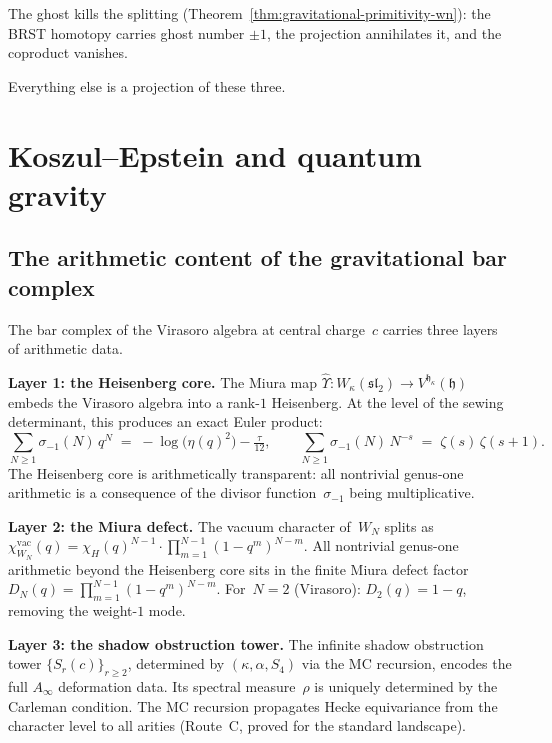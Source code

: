 \documentclass[11pt]{article}
\begin{document}
The ghost kills the splitting
(Theorem~\ref{thm:gravitational-primitivity-wn}): the BRST
homotopy carries ghost number $\pm 1$, the projection
annihilates it, and the coproduct vanishes.

Everything else is a projection of these three.


\section{Koszul--Epstein and quantum gravity}
\label{sec:koszul-epstein-gravity}

\subsection{The arithmetic content of the gravitational bar complex}

The bar complex of the Virasoro algebra at central charge~$c$
carries three layers of arithmetic data.

\textbf{Layer 1: the Heisenberg core.}
The Miura map $\hat\Upsilon\colon W_\kappa(\mathfrak{sl}_2) \to
V^{\mathfrak{h}_\kappa}(\mathfrak{h})$ embeds the Virasoro
algebra into a rank-$1$ Heisenberg.  At the level of the
sewing determinant, this produces an exact Euler product:
\[
\sum_{N \ge 1} \sigma_{-1}(N)\,q^N
\;=\; -\log\bigl(\eta(q)^2\bigr) - \tfrac{\tau}{12},
\qquad
\sum_{N \ge 1} \sigma_{-1}(N)\,N^{-s}
\;=\; \zeta(s)\,\zeta(s+1).
\]
The Heisenberg core is arithmetically transparent: all
nontrivial genus-one arithmetic is a consequence of the
divisor function~$\sigma_{-1}$ being multiplicative.

\textbf{Layer 2: the Miura defect.}
The vacuum character of~$W_N$ splits as
$\chi^{\mathrm{vac}}_{W_N}(q)
= \chi_H(q)^{N-1} \cdot
\prod_{m=1}^{N-1}(1-q^m)^{N-m}$.
All nontrivial genus-one arithmetic beyond the Heisenberg core
sits in the finite Miura defect factor
$D_N(q) = \prod_{m=1}^{N-1}(1-q^m)^{N-m}$.
For~$N = 2$ (Virasoro): $D_2(q) = 1 - q$, removing the weight-$1$
mode.

\textbf{Layer 3: the shadow obstruction tower.}
The infinite shadow obstruction tower $\{S_r(c)\}_{r \ge 2}$, determined by
$(\kappa, \alpha, S_4)$ via the MC recursion, encodes the full
$A_\infty$ deformation data.  Its spectral measure~$\rho$ is
uniquely determined by the Carleman condition.  The MC recursion
propagates Hecke equivariance from the character level to all
arities (Route~C, proved for the standard landscape).
\end{document}

